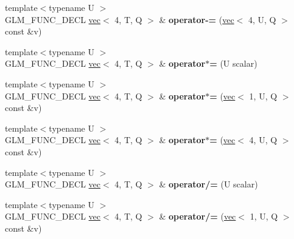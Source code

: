 \begin{DoxyCompactItemize}
\item 
\mbox{\label{structglm_1_1vec_3_014_00_01T_00_01Q_01_4_a6c7121aa85c158912c509760cf65da75}} 
{\footnotesize template$<$typename U $>$ }\\G\+L\+M\+\_\+\+F\+U\+N\+C\+\_\+\+D\+E\+CL \hyperlink{structglm_1_1vec}{vec}$<$ 4, T, Q $>$ \& {\bfseries operator-\/=} (\hyperlink{structglm_1_1vec}{vec}$<$ 4, U, Q $>$ const \&v)
\item 
\mbox{\label{structglm_1_1vec_3_014_00_01T_00_01Q_01_4_a084756852ac777dca065e256f72aa75f}} 
{\footnotesize template$<$typename U $>$ }\\G\+L\+M\+\_\+\+F\+U\+N\+C\+\_\+\+D\+E\+CL \hyperlink{structglm_1_1vec}{vec}$<$ 4, T, Q $>$ \& {\bfseries operator$\ast$=} (U scalar)
\item 
\mbox{\label{structglm_1_1vec_3_014_00_01T_00_01Q_01_4_a4b89052935e5383d7b04478b91a25823}} 
{\footnotesize template$<$typename U $>$ }\\G\+L\+M\+\_\+\+F\+U\+N\+C\+\_\+\+D\+E\+CL \hyperlink{structglm_1_1vec}{vec}$<$ 4, T, Q $>$ \& {\bfseries operator$\ast$=} (\hyperlink{structglm_1_1vec}{vec}$<$ 1, U, Q $>$ const \&v)
\item 
\mbox{\label{structglm_1_1vec_3_014_00_01T_00_01Q_01_4_a27ac62ee4c5d423e772c40d015ee54da}} 
{\footnotesize template$<$typename U $>$ }\\G\+L\+M\+\_\+\+F\+U\+N\+C\+\_\+\+D\+E\+CL \hyperlink{structglm_1_1vec}{vec}$<$ 4, T, Q $>$ \& {\bfseries operator$\ast$=} (\hyperlink{structglm_1_1vec}{vec}$<$ 4, U, Q $>$ const \&v)
\item 
\mbox{\label{structglm_1_1vec_3_014_00_01T_00_01Q_01_4_a986552cf3068f2573edbcc4f203f1902}} 
{\footnotesize template$<$typename U $>$ }\\G\+L\+M\+\_\+\+F\+U\+N\+C\+\_\+\+D\+E\+CL \hyperlink{structglm_1_1vec}{vec}$<$ 4, T, Q $>$ \& {\bfseries operator/=} (U scalar)
\item 
\mbox{\label{structglm_1_1vec_3_014_00_01T_00_01Q_01_4_aa1b32778dee89d5111b478d6c95a654d}} 
{\footnotesize template$<$typename U $>$ }\\G\+L\+M\+\_\+\+F\+U\+N\+C\+\_\+\+D\+E\+CL \hyperlink{structglm_1_1vec}{vec}$<$ 4, T, Q $>$ \& {\bfseries operator/=} (\hyperlink{structglm_1_1vec}{vec}$<$ 1, U, Q $>$ const \&v)

\end{DoxyCompactItemize}
